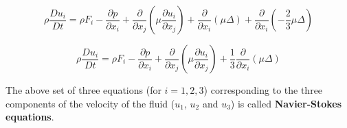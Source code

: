 \begin{equation}
\rho \frac{Du_i}{Dt} = \rho F_i -  \frac{\partial p}{\partial x_i} +  
\frac{\partial}{\partial x_j} \left( \mu \frac{\partial u_i}{\partial x_j} \right) + 
\frac{\partial}{\partial x_i} \left( \mu \Delta \right) + 
\frac{\partial}{\partial x_i} \left( -\frac{2}{3} \mu \Delta \right) 
\end{equation} 


\begin{equation}
\label{ns0}
\boxed{
\rho \frac{Du_i}{Dt} = \rho F_i -  \frac{\partial p}{\partial x_i} +  
\frac{\partial}{\partial x_j} \left( \mu \frac{\partial u_i}{\partial x_j} \right) + 
\frac{1}{3}\frac{\partial}{\partial x_i} \left( \mu \Delta \right) 
}
\end{equation} 

The above set of three equations (for $i=1,2,3$) corresponding to the three components of the velocity of the fluid ($u_1$, $u_2$ and $u_3$) is called {\bf Navier-Stokes equations}.




